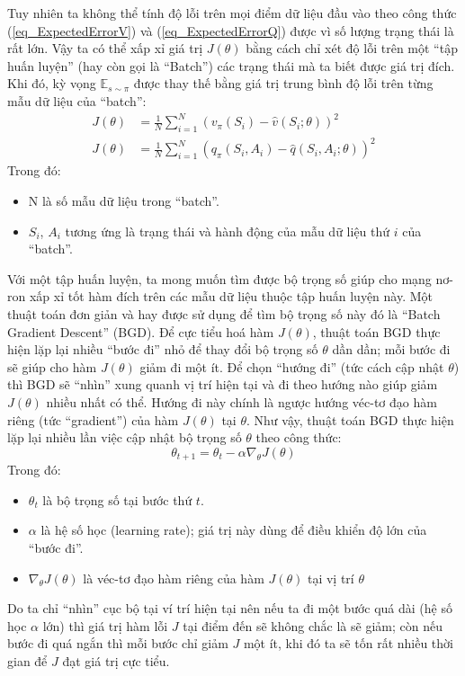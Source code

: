 	Tuy nhiên ta không thể tính độ lỗi trên mọi điểm dữ liệu đầu vào theo công thức (\ref{eq_ExpectedErrorV}) và (\ref{eq_ExpectedErrorQ}) được vì số lượng trạng thái là rất lớn.
	Vậy ta có thể xấp xỉ giá trị $J(\theta)$ bằng cách chỉ xét độ lỗi trên một ``tập huấn luyện'' (hay còn gọi là ``Batch'') các trạng thái mà ta biết được giá trị đích.
	Khi đó, kỳ vọng $\mathbb{E}_{s \sim \pi}$ được thay thế bằng giá trị trung bình độ lỗi trên từng mẫu dữ liệu của ``batch'':
	\begin{align}
		\label{eq_BatchErrorV}
		J(\theta) &= \frac{1}{N} \sum_{i = 1}^{N}(v_{\pi}(S_{i}) - \hat{v}(S_{i};\theta))^2\\
		\label{eq_BatchErrorQ}
		J(\theta) &= \frac{1}{N} \sum_{i = 1}^{N}(q_{\pi}(S_i,A_i) - \hat{q}(S_i,A_i;\theta))^2		
	\end{align}
	Trong đó:
	\begin{itemize}
		\item N là số mẫu dữ liệu trong ``batch''.
		\item $S_i$, $A_i$ tương ứng là trạng thái và hành động của mẫu dữ liệu thứ $i$ của ``batch''.
	\end{itemize}
	Với một tập huấn luyện, ta mong muốn tìm được bộ trọng số giúp cho mạng nơ-ron xấp xỉ tốt hàm đích trên các mẫu dữ liệu thuộc tập huấn luyện này.
	Một thuật toán đơn giản và hay được sử dụng để tìm bộ trọng số này đó là ``Batch Gradient Descent'' (BGD).
	Để cực tiểu hoá hàm $J(\theta)$, thuật toán BGD thực hiện lặp lại nhiều ``bước đi'' nhỏ để thay đổi bộ trọng số $\theta$ dần dần; mỗi bước đi sẽ giúp cho hàm $J(\theta)$ giảm đi một ít.
	Để chọn ``hướng đi'' (tức cách cập nhật $\theta$) thì BGD sẽ ``nhìn'' xung quanh vị trí hiện tại và đi theo hướng nào giúp giảm $J(\theta)$ nhiều nhất có thể.
	Hướng đi này chính là ngược hướng véc-tơ đạo hàm riêng (tức ``gradient'') của hàm $J(\theta)$ tại $\theta$.
	Như vậy, thuật toán BGD thực hiện lặp lại nhiều lần việc cập nhật bộ trọng số $\theta$ theo công thức:
	\begin{equation}
		\theta_{t+1} = \theta_{t} - \alpha \nabla_{\theta}J(\theta)
	\end{equation}
	Trong đó:
	\begin{itemize}
		\item $\theta_{t}$ là bộ trọng số tại bước thứ $t$.
		\item $\alpha$ là hệ số học (learning rate); giá trị này dùng để điều khiển độ lớn của ``bước đi''.
		\item $\nabla_{\theta}J(\theta)$ là véc-tơ đạo hàm riêng của hàm $J(\theta)$ tại vị trí $\theta$
	\end{itemize}
	Do ta chỉ ``nhìn'' cục bộ tại ví trí hiện tại nên nếu ta đi một bước quá dài (hệ số học $\alpha$ lớn) thì giá trị hàm lỗi $J$ tại điểm đến sẽ không chắc là sẽ giảm;
	còn nếu bước đi quá ngắn thì mỗi bước chỉ giảm $J$ một ít, khi đó ta sẽ tốn rất nhiều thời gian để $J$ đạt giá trị cực tiểu.
	
